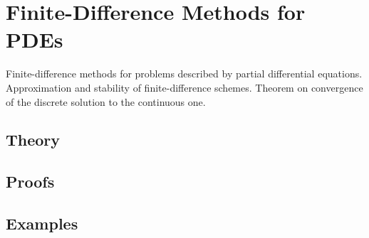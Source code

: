 
\section{Finite-Difference Methods for PDEs}
\label{sec:2.1.12-fd-pde-general}

\begin{ticket}
Finite-difference methods for problems described by partial differential equations. Approximation and stability of finite-difference schemes. Theorem on convergence of the discrete solution to the continuous one.
\end{ticket}

\subsection*{Theory}

\subsection*{Proofs}

\subsection*{Examples}

